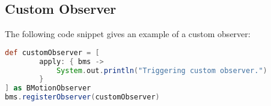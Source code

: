 \subsection{Custom Observer}
\label{sec:custom_observers}

The following code snippet gives an example of a custom observer:

\begin{lstlisting}[float=ht,language=Groovy]
def customObserver = [
        apply: { bms ->
            System.out.println("Triggering custom observer.")
        }
] as BMotionObserver
bms.registerObserver(customObserver)
\end{lstlisting}